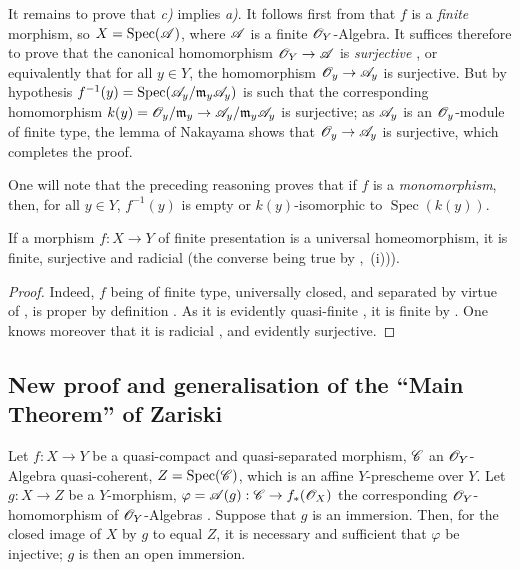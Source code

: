It remains to prove that \emph{c)} implies \emph{a)}.
It follows first from  that $f$ is a \emph{finite} morphism, so $X=\operatorname{Spec}(\mathscr{A})$, where $\mathscr{A}$ is a finite $\mathscr{O}_Y$-Algebra.
It suffices therefore to prove that the canonical homomorphism $\mathscr{O}_Y\to\mathscr{A}$ is \emph{surjective} , or equivalently that for all $y\in Y$, the homomorphism $\mathscr{O}_y\to\mathscr{A}_y$ is surjective.
But by hypothesis
$f^{-1}(y)=\operatorname{Spec}(\mathscr{A}_y/\mathfrak{m}_y\mathscr{A}_y)$  is such that the corresponding homomorphism $k(y)=\mathscr{O}_y/\mathfrak{m}_y\to\mathscr{A}_y/\mathfrak{m}_y\mathscr{A}_y$ is surjective; as $\mathscr{A}_y$ is an $\mathscr{O}_y$-module of finite type, the lemma of Nakayama shows that $\mathscr{O}_y\to\mathscr{A}_y$ is surjective, which completes the proof.

\begin{remark}[8.11.5.1]
\label{IV.8.11.5.1}
One will note that the preceding reasoning proves that if $f$ is a \emph{monomorphism}, then, for all $y\in Y$, $f^{-1}(y)$ is empty or $k(y)$-isomorphic to $\operatorname{Spec}(k(y))$.
\end{remark}

\begin{proposition}[8.11.6]
\label{IV.8.11.6}
If a morphism $f:X\to Y$ of finite presentation is a universal homeomorphism, it is finite, surjective and radicial (the converse being true by ,~(i))).
\end{proposition}

\begin{proof}
Indeed, $f$ being of finite type, universally closed, and separated by virtue of , is proper by definition .
As it is evidently quasi-finite , it is finite by .
One knows moreover that it is radicial , and evidently surjective.
\end{proof}

\subsection{New proof and generalisation of the ``Main Theorem'' of Zariski}
\label{subsection:IV.8.12}
\label{IV.8.12}

\begin{lemma}[8.12.1]
\label{IV.8.12.1}
Let $f:X\to Y$ be a quasi-compact and quasi-separated morphism, $\mathscr{C}$ an $\mathscr{O}_Y$-Algebra quasi-coherent, $Z=\operatorname{Spec}(\mathscr{C})$, which is an affine $Y$-prescheme over $Y$.
Let $g:X\to Z$ be a $Y$-morphism, $\varphi=\mathscr{A}(g):\mathscr{C}\to f_*(\mathscr{O}_X)$ the corresponding $\mathscr{O}_Y$-homomorphism of $\mathscr{O}_Y$-Algebras .
Suppose that $g$ is an immersion.
Then, for the closed image of $X$ by $g$  to equal $Z$, it is necessary and sufficient that $\varphi$ be injective; $g$ is then an open immersion.
\end{lemma}

